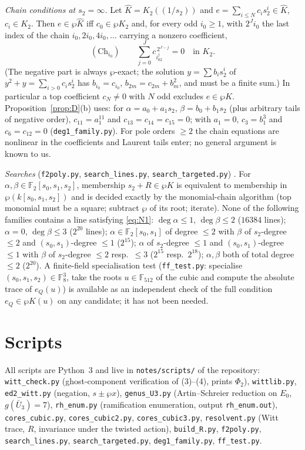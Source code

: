 \emph{Chain conditions at $s_2=\infty$.} Let $\hat K=K_2((1/s_2))$ and
$e=\sum_{i\le N}c_is_2^i\in\hat K$, $c_i\in K_2$. Then $e\in\wp\hat K$ iff $c_0\in\wp K_2$
and, for every odd $i_0\ge1$, with $2^Ji_0$ the last index of the chain
$i_0,2i_0,4i_0,\dots$ carrying a nonzero coefficient,
\[
(\mathrm{Ch}_{i_0})\qquad\sum_{j=0}^{J}c_{i_02^j}^{\,2^{J-j}}=0\quad\text{in }K_2 .
\]
(The negative part is always $\wp$-exact; the solution $y=\sum b_is_2^i$ of
$y^2+y=\sum_{i>0}c_is_2^i$ has $b_{i_0}=c_{i_0}$, $b_{2m}=c_{2m}+b_m^2$, and must be a
finite sum.) In particular a top coefficient $c_N\ne0$ with $N$ odd excludes
$e\in\wp K$. Proposition~\ref{prop:D}(b) uses: for $\alpha=a_0+a_1s_2$,
$\beta=b_0+b_1s_2$ (plus arbitrary tails of negative order), $c_{11}=a_1^{11}$ and
$c_{13}=c_{14}=c_{15}=0$; with $a_1=0$, $c_3=b_1^3$ and $c_6=c_{12}=0$
(\texttt{deg1\_family.py}). For pole orders $\ge2$ the chain equations are nonlinear in
the coefficients and Laurent tails enter; no general argument is known to us.

\emph{Searches} (\texttt{f2poly.py}, \texttt{search\_lines.py},
\texttt{search\_targeted.py}) . For $\alpha,\beta\in\mathbb F_2[s_0,s_1,s_2]$,
membership $s_2+R\in\wp K$ is equivalent to membership in $\wp(k[s_0,s_1,s_2])$ and is
decided exactly by the monomial-chain algorithm (top monomial must be a square; subtract
$\wp$ of its root; iterate). None of the following families contains a line satisfying
\eqref{eq:N1}: $\deg\alpha\le1$, $\deg\beta\le2$ ($16384$ lines); $\alpha=0$,
$\deg\beta\le3$ ($2^{20}$ lines); $\alpha\in\mathbb F_2[s_0,s_1]$ of degree $\le2$ with
$\beta$ of $s_2$-degree $\le2$ and $(s_0,s_1)$-degree $\le1$ ($2^{15}$); $\alpha$ of
$s_2$-degree $\le1$ and $(s_0,s_1)$-degree $\le1$ with $\beta$ of $s_2$-degree $\le2$
resp.\ $\le3$ ($2^{15}$ resp.\ $2^{18}$); $\alpha,\beta$ both of total degree $\le2$
($2^{20}$). A finite-field specialisation test (\texttt{ff\_test.py}: specialise
$(s_0,s_1,s_2)\in\mathbb F_8^3$, take the roots $u\in\mathbb F_{512}$ of the cubic and
compute the absolute trace of $e_Q(u)$) is available as an independent check of the full
condition $e_Q\in\wp K(u)$ on any candidate; it has not been needed.

\section{Scripts}\label{app:scripts}
All scripts are Python~3 and live in \texttt{notes/scripts/} of the repository:
\texttt{witt\_check.py} (ghost-component verification of (3)--(4), prints $\Phi_2$),
\texttt{wittlib.py}, \texttt{ed2\_witt.py} (negation, $s\pm\wp x$),
\texttt{genus\_U3.py} (Artin--Schreier reduction on $E_0$, $g(\bar U_3)=7$),
\texttt{rh\_enum.py} (ramification enumeration, output \texttt{rh\_enum.out}),
\texttt{cores\_cubic.py}, \texttt{cores\_cubic2.py}, \texttt{cores\_cubic3.py},
\texttt{resolvent.py} (Witt trace, $R$, invariance under the twisted action),
\texttt{build\_R.py}, \texttt{f2poly.py}, \texttt{search\_lines.py},
\texttt{search\_targeted.py}, \texttt{deg1\_family.py}, \texttt{ff\_test.py}.
